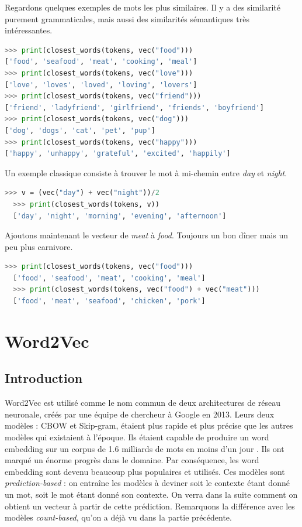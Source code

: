 \documentclass[11pt, a4paper]{report}
\begin{document}
Regardons quelques exemples de mots les plus similaires. Il y a des similarité 
purement grammaticales, mais aussi des similarités sémantiques très intéressantes.
\begin{lstlisting}[language=Python]
  >>> print(closest_words(tokens, vec("food")))
['food', 'seafood', 'meat', 'cooking', 'meal']
>>> print(closest_words(tokens, vec("love")))
['love', 'loves', 'loved', 'loving', 'lovers']
>>> print(closest_words(tokens, vec("friend")))
['friend', 'ladyfriend', 'girlfriend', 'friends', 'boyfriend']
>>> print(closest_words(tokens, vec("dog")))
['dog', 'dogs', 'cat', 'pet', 'pup']
>>> print(closest_words(tokens, vec("happy")))
['happy', 'unhappy', 'grateful', 'excited', 'happily']
\end{lstlisting}  

Un exemple classique consiste à trouver le mot à mi-chemin entre \textit{day} et 
\textit{night}.
\begin{lstlisting}[language=Python]
  >>> v = (vec("day") + vec("night"))/2
  >>> print(closest_words(tokens, v))
  ['day', 'night', 'morning', 'evening', 'afternoon']
\end{lstlisting}  

Ajoutons maintenant le vecteur de \textit{meat} à \textit{food}.
Toujours un bon dîner mais un peu plus carnivore. 
\begin{lstlisting}[language=Python]
  >>> print(closest_words(tokens, vec("food")))
  ['food', 'seafood', 'meat', 'cooking', 'meal']
  >>> print(closest_words(tokens, vec("food") + vec("meat")))
  ['food', 'meat', 'seafood', 'chicken', 'pork']
\end{lstlisting}  

\section{Word2Vec}
\subsection{Introduction}
\cite{wikipedia-word2vec} \cite{wikipedia-word2vec-fr} Word2Vec est utilisé comme le nom commun de deux architectures de réseau neuronale, créés par 
une équipe de chercheur à Google en 2013. Leurs deux modèles : CBOW et Skip-gram, étaient plus 
rapide et plus précise que les autres modèles qui existaient à l'époque. Ils étaient capable 
de produire un word embedding sur un corpus de 1.6 milliards de mots en moins d'un jour \cite{word2vec-original}.
Ils ont marqué un énorme progrès dans le domaine. Par conséquence, les word embedding sont 
devenu beaucoup plus populaires et utilisés. Ces modèles sont \textit{prediction-based} : on 
entraîne les modèles à deviner soit le contexte étant donné un mot, soit le mot étant donné
son contexte. On verra dans la suite comment on obtient un vecteur à partir de cette prédiction.
Remarquons la différence avec les modèles \textit{count-based}, qu'on a déjà vu dans la partie 
précédente.
\end{document}
